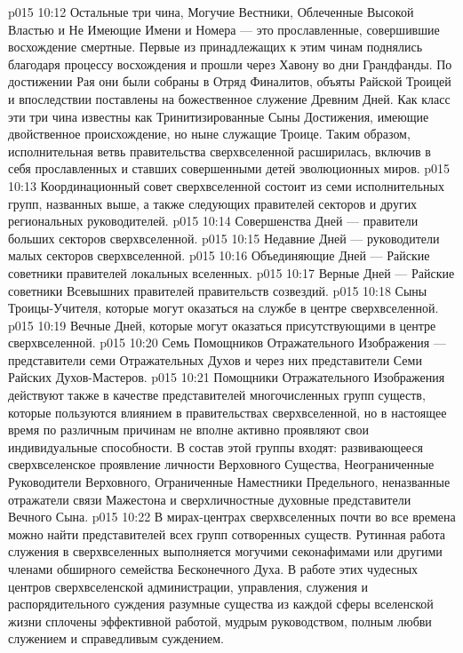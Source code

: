 \vs p015 10:12 Остальные три чина, Могучие Вестники, Облеченные Высокой Властью и Не Имеющие Имени и Номера --- это прославленные, совершившие восхождение смертные. Первые из принадлежащих к этим чинам поднялись благодаря процессу восхождения и прошли через Хавону во дни Грандфанды. По достижении Рая они были собраны в Отряд Финалитов, объяты Райской Троицей и впоследствии поставлены на божественное служение Древним Дней. Как класс эти три чина известны как Тринитизированные Сыны Достижения, имеющие двойственное происхождение, но ныне служащие Троице. Таким образом, исполнительная ветвь правительства сверхвселенной расширилась, включив в себя прославленных и ставших совершенными детей эволюционных миров.
\vs p015 10:13 Координационный совет сверхвселенной состоит из семи исполнительных групп, названных выше, а также следующих правителей секторов и других региональных руководителей.
\vs p015 10:14 \bibnobreakspace Совершенства Дней --- правители больших секторов сверхвселенной.
\vs p015 10:15 \bibnobreakspace Недавние Дней --- руководители малых секторов сверхвселенной.
\vs p015 10:16 \bibnobreakspace Объединяющие Дней --- Райские советники правителей локальных вселенных.
\vs p015 10:17 \bibnobreakspace Верные Дней --- Райские советники Всевышних правителей правительств созвездий.
\vs p015 10:18 \bibnobreakspace Сыны Троицы\hyp{}Учителя, которые могут оказаться на службе в центре сверхвселенной.
\vs p015 10:19 \bibnobreakspace Вечные Дней, которые могут оказаться присутствующими в центре сверхвселенной.
\vs p015 10:20 \bibnobreakspace Семь Помощников Отражательного Изображения --- представители семи Отражательных Духов и через них представители Семи Райских Духов\hyp{}Мастеров.
\vs p015 10:21 \pc Помощники Отражательного Изображения действуют также в качестве представителей многочисленных групп существ, которые пользуются влиянием в правительствах сверхвселенной, но в настоящее время по различным причинам не вполне активно проявляют свои индивидуальные способности. В состав этой группы входят: развивающееся сверхвселенское проявление личности Верховного Существа, Неограниченные Руководители Верховного, Ограниченные Наместники Предельного, неназванные отражатели связи Мажестона и сверхличностные духовные представители Вечного Сына.
\vs p015 10:22 \pc В мирах\hyp{}центрах сверхвселенных почти во все времена можно найти представителей всех групп сотворенных существ. Рутинная работа служения в сверхвселенных выполняется могучими секонафимами или другими членами обширного семейства Бесконечного Духа. В работе этих чудесных центров сверхвселенской администрации, управления, служения и распорядительного суждения разумные существа из каждой сферы вселенской жизни сплочены эффективной работой, мудрым руководством, полным любви служением и справедливым суждением.
